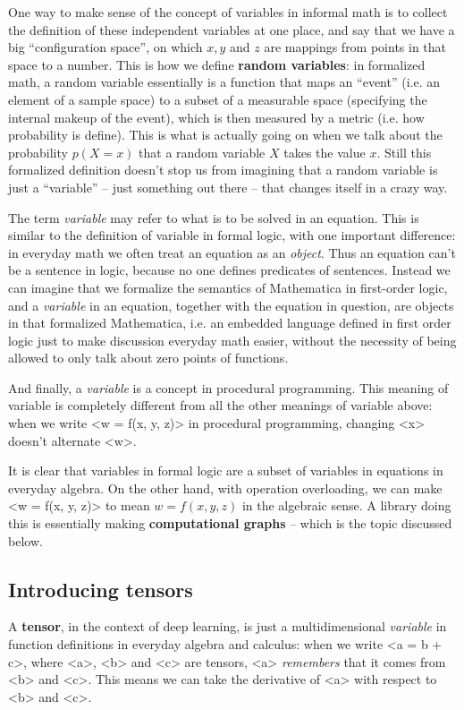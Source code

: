 \documentclass[hyperref, a4paper, 12pt]{report}
\newcommand*{\concept}[1]{{\textbf{#1}}}
\newcommand*{\term}[1]{\textit{#1}}
\def\texttt#1{<#1>}%
\newcommand{\shortcode}[1]{\texttt{#1}}
\begin{document}
One way to make sense of the concept of variables in informal math is 
to collect the definition of these independent variables at one place,
and say that we have a big ``configuration space'',
on which $x, y$ and $z$ are mappings from points in that space to a number.
This is how we define \concept{random variables}:
in formalized math, a random variable essentially is a function that maps an ``event'' (i.e. an element of a sample space) to a subset of a measurable space (specifying the internal makeup of the event),
which is then measured by a metric (i.e. how probability is define).
This is what is actually going on when we talk about the probability $p(X=x)$ that a random variable $X$ takes the value $x$.
Still this formalized definition doesn't stop us from imagining that a random variable is just a ``variable'' -- just something out there -- that changes itself in a crazy way.

The term \term{variable} may refer to what is to be solved in an equation.
This is similar to the definition of variable in formal logic,
with one important difference:
in everyday math we often treat an equation as an \emph{object}.
Thus an equation can't be a sentence in logic,
because no one defines predicates of sentences.
Instead we can imagine that we formalize the semantics of Mathematica in first-order logic,
and a \emph{variable} in an equation, together with the equation in question,
are objects in that formalized Mathematica,
i.e. an embedded language defined in first order logic
just to make discussion everyday math easier,
without the necessity of being allowed to only talk about zero points of functions.

And finally, a \term{variable} is a concept in procedural programming.
This meaning of variable is completely different from all the other meanings of variable above:
when we write \shortcode{w = f(x, y, z)} in procedural programming,
changing \shortcode{x} doesn't alternate \shortcode{w}.

It is clear that variables in formal logic are a subset of variables in equations in everyday algebra.
On the other hand, with operation overloading,
we can make \shortcode{w = f(x, y, z)} to mean $w = f(x, y, z)$ in the algebraic sense.
A library doing this is essentially making \concept{computational graphs}
-- which is the topic discussed below.

\subsection{Introducing tensors}
A \concept{tensor}, in the context of deep learning,
is just a multidimensional \emph{variable} in function definitions in everyday algebra and calculus:
when we write \shortcode{a = b + c},
where \shortcode{a}, \shortcode{b} and \shortcode{c} are tensors,
\shortcode{a} \emph{remembers} that it comes from \shortcode{b} and \shortcode{c}.
This means we can take the derivative of \shortcode{a} with respect to \shortcode{b} and \shortcode{c}.
\end{document}
